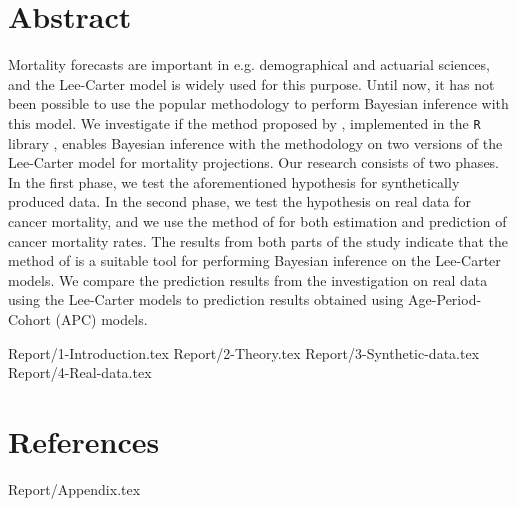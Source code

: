 \documentclass[11pt,a4paper,twoside]{article}
\numberwithin{equation}{section}
\numberwithin{figure}{section}
\begin{document}
\maketitle\thispagestyle{empty}
\clearpage{}

\section*{Abstract}
Mortality forecasts are important in e.g. demographical and actuarial sciences, and the Lee-Carter model \parencite{LeeCarter1992} is widely used for this purpose. Until now, it has not been possible to use the popular \inla methodology \parencite{rue2009inla} to perform Bayesian inference with this model. We investigate if the method proposed by \textcite{BachlLindgren2019}, implemented in the \texttt{R} library \inlabru, enables Bayesian inference with the \inla methodology on two versions of the Lee-Carter model for mortality projections.
Our research consists of two phases. In the first phase, we test the aforementioned hypothesis for synthetically produced data. In the second phase, we test the hypothesis on real data for cancer mortality, and we use the method of \textcite{BachlLindgren2019} for both estimation and prediction of cancer mortality rates. The results from both parts of the study indicate that the method of \textcite{BachlLindgren2019} is a suitable tool for performing Bayesian inference on the Lee-Carter models. We compare the prediction results from the investigation on real data using the Lee-Carter models to prediction results obtained using Age-Period-Cohort (APC) models. 

\clearpage\tableofcontents
\newpage
\printacronyms

\clearpage{}
{Report/1-Introduction.tex}
{Report/2-Theory.tex}
{Report/3-Synthetic-data.tex}
{Report/4-Real-data.tex}


\clearpage
\section*{References}
\printbibliography[heading=none]
%
%
%

\begin{appendices}
\clearpage
{Report/Appendix.tex}
\end{appendices}
\end{document}
